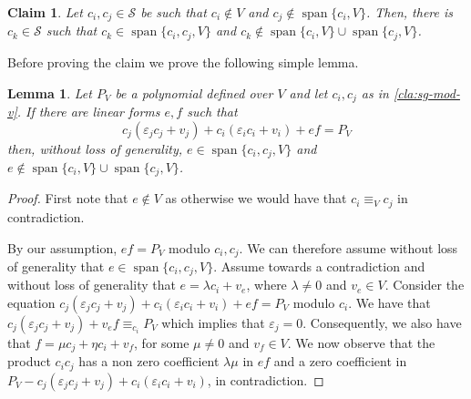 \documentclass[10pt,a4paper]{article}
\newtheorem{claim}[theorem]{Claim}
\newtheorem{lemma}[theorem]{Lemma}
\newcommand{\calS}{{\mathcal{S}}}
\newcommand{\spn}[1]{\operatorname{span}\{{#1}\}}
\def\epsilon{\varepsilon}
\begin{document}
\begin{claim} \label{cla:sg-mod-v}
Let $c_i, c_j \in \calS$ be such that $c_i \notin V$ and $c_j \notin \spn{c_i,V}$. Then, there is $c_k \in \calS$ such that $c_k \in \spn{c_i,c_j,V}$ and $c_k \notin \spn{c_i,V}\cup \spn{c_j,V}$.
\end{claim}

Before proving the claim we prove the following simple lemma.

\begin{lemma}\label{lem:ef}
Let $P_V$ be a polynomial defined over $V$ and let $c_i,c_j$ as in \autoref{cla:sg-mod-v}. If there are linear forms $e,f$ such that $$c_j(\epsilon_j c_j + v_j) + c_i(\epsilon_i c_i + v_i) + ef = P_V$$ then, without loss of generality,  $e \in \spn{c_i,c_j,V}$ and $e \notin \spn{c_i,V}\cup \spn{c_j,V}$.
\end{lemma}

\begin{proof}



First note that $e\not\in V$ as otherwise we would have that $c_i\equiv_V c_j$ in contradiction.

By our assumption, $ef =P_V$ modulo $c_i,c_j$.  We can therefore assume without loss of generality that  $e \in \spn{c_i,c_j,V}$. 
Assume towards a contradiction and without loss of generality that  $e = \lambda c_i + v_e$, where $\lambda \neq 0$ and $v_e\in V$. Consider the equation $c_j(\epsilon_j c_j + v_j) + c_i(\epsilon_i c_i + v_i) + ef = P_V$ modulo $c_i$. We have that $c_j(\epsilon_j c_j + v_j) + v_e f \equiv_{c_i} P_V$ which implies that $\epsilon_j=0$. Consequently, we also have that  $f = \mu c_j + \eta c_i + v_f$, for some $\mu \neq 0$ and $v_f \in V$. We now observe that the product $c_ic_j$ has a non zero coefficient $\lambda\mu$ in $ef$ and a zero coefficient in $P_V - c_j(\epsilon_j c_j + v_j) + c_i(\epsilon_i c_i + v_i) $, in contradiction.
\end{proof}
\end{document}

